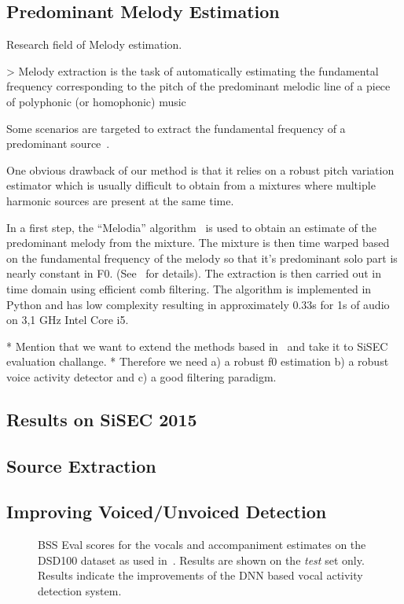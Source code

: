 \subsection{Predominant Melody Estimation}

Research field of Melody estimation.

> Melody extraction is the task of automatically estimating the fundamental frequency corresponding to the pitch of the predominant melodic line of a piece of polyphonic (or homophonic) music

Some scenarios are targeted to extract the fundamental frequency of a predominant source~\cite{salamon12}.

One obvious drawback of our method is that it relies on a robust pitch variation estimator which is usually difficult to obtain from a mixtures where multiple harmonic sources are present at the same time.

In a first step, the ``Melodia'' algorithm~\cite{salamon12} is used to obtain an estimate of the predominant melody from the mixture. The mixture is then time warped based on the fundamental frequency of the melody so that it’s predominant solo part is nearly constant in F0. (See~\cite{salamon12} for details). The extraction is then carried out in time domain using efficient comb filtering.
The algorithm is implemented in Python and has low complexity resulting in approximately 0.33s for 1s of audio on 3,1 GHz Intel Core i5.

* Mention that we want to extend the methods based in~\cite{stoeter14} and take it to SiSEC evaluation challange.
* Therefore we need a) a robust f0 estimation b) a robust voice activity detector and c) a good filtering paradigm.

\subsection{Results on SiSEC 2015}
\label{ssec:performance}

\subsection{Source Extraction}


\subsection{Improving Voiced/Unvoiced Detection}

\begin{figure}
  
  \caption{BSS Eval scores for the vocals and accompaniment estimates on the DSD100 dataset as used in~\cite{liutkus17}. Results are shown on the \emph{test} set only. Results indicate the improvements of the DNN based vocal activity detection system.}
  \label{fig:05_comparison_sto_stodnn}
\end{figure}

